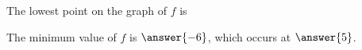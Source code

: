 \documentclass{ximera}
\begin{document}
\begin{example}
\begin{question} 


The lowest point on the graph of $f$ is


\begin{multipleChoice}
\end{multipleChoice}
\end{question}


\begin{question} 


The minimum value of $f$ is $\answer{-6}$, which occurs at $\answer{5}$.
\end{question}







\end{example}






\newpage
\end{document}
